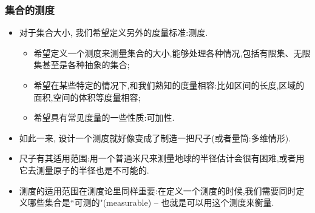 \begin{frame}
	\frametitle{集合的测度}
	\begin{itemize}[<+-|alert@+>]
		\item 对于集合大小, 我们希望定义另外的度量标准:测度.
		\begin{itemize}[<+-|alert@+>]
			\item 希望定义一个测度来测量集合的大小,能够处理各种情况,包括有限集、无限集甚至是各种抽象的集合;
			\item 希望在某些特定的情况下,和我们熟知的度量相容:比如区间的长度,区域的面积,空间的体积等度量相容;
			\item 希望具有常见度量的一些性质:可加性.
		\end{itemize}
		\item 如此一来, 设计一个测度就好像变成了制造一把尺子(或者量筒:多维情形).
		\item 尺子有其适用范围:用一个普通米尺来测量地球的半径估计会很有困难,或者用它去测量原子的半径也是不可能的.
		\item 测度的适用范围在测度论里同样重要:在定义一个测度的时候,我们需要同时定义哪些集合是“可测的"({\rm measurable}) -- 也就是可以用这个测度来衡量.
	\end{itemize}
\end{frame}
